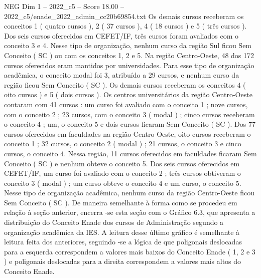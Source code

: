 \begin{textsample}{NEG Dim 1 – 2022\_c5 – Score 18.00 – 2022\_c5/enade\_2022\_admin\_cc20b69854.txt}
Os demais cursos receberam os conceitos 1 ( quatro cursos ), 2 ( 37 cursos ), 4 ( 18 cursos ) e 5 ( três cursos ).
Dos seis cursos oferecidos em CEFET/IF, três cursos foram avaliados com o conceito 3 e 4.
Nesse tipo de organização, nenhum curso da região Sul ficou Sem Conceito ( SC ) ou com os conceitos 1, 2 e 5.
Na região Centro-Oeste, 48 dos 172 cursos oferecidos eram mantidos por universidades.
Para esse tipo de organização acadêmica, o conceito modal foi 3, atribuído a 29 cursos, e nenhum curso da região ficou Sem Conceito ( SC ).
Os demais cursos receberam os conceitos 4 ( oito cursos ) e 5 ( dois cursos ).
Os centros universitários da região Centro-Oeste contaram com 41 cursos : um curso foi avaliado com o conceito 1 ; nove cursos, com o conceito 2 ; 23 cursos, com o conceito 3 ( modal ) ; cinco cursos receberam o conceito 4 ; um, o conceito 5 e dois cursos ficaram Sem Conceito ( SC ).
Dos 77 cursos oferecidos em faculdades na região Centro-Oeste, oito cursos receberam o conceito 1 ; 32 cursos, o conceito 2 ( modal ) ; 21 cursos, o conceito 3 e cinco cursos, o conceito 4.
Nessa região, 11 cursos oferecidos em faculdades ficaram Sem Conceito ( SC ) e nenhum obteve o conceito 5.
Dos seis cursos oferecidos em CEFET/IF, um curso foi avaliado com o conceito 2 ; três cursos obtiveram o conceito 3 ( modal ) ; um curso obteve o conceito 4 e um curso, o conceito 5.
Nesse tipo de organização acadêmica, nenhum curso da região Centro-Oeste ficou Sem Conceito ( SC ).
De maneira semelhante à forma como se procedeu em relação à seção anterior, encerra -se esta seção com o Gráfico 6.3, que apresenta a distribuição do Conceito Enade dos cursos de Administração segundo a organização acadêmica da IES.
A leitura desse último gráfico é semelhante à leitura feita dos anteriores, seguindo -se a lógica de que poligonais deslocadas para a esquerda correspondem a valores mais baixos do Conceito Enade ( 1, 2 e 3 ) e poligonais deslocadas para a direita correspondem a valores mais altos do Conceito Enade.

\end{textsample}
